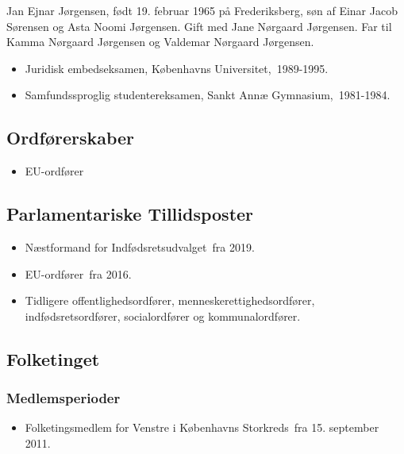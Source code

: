 \documentclass[11pt, a4paper]{awesome-cv}
\begin{document}
\makecvheader[R]
\makelettertitle
\begin{cvletter}
Jan Ejnar Jørgensen, født 19. februar 1965 på Frederiksberg, søn af Einar Jacob Sørensen og Asta Noomi Jørgensen. Gift med Jane Nørgaard Jørgensen. Far til Kamma Nørgaard Jørgensen og Valdemar Nørgaard Jørgensen.

\begin{itemize}
\item Juridisk embedseksamen, Københavns Universitet, 1989-1995.
\item Samfundssproglig studentereksamen, Sankt Annæ Gymnasium, 1981-1984.
\end{itemize}
\subsection*{Ordførerskaber}
\begin{itemize}
\item EU-ordfører
\end{itemize}
\subsection*{Parlamentariske Tillidsposter}
\begin{itemize}
\item Næstformand for Indfødsretsudvalget fra 2019.
\item EU-ordfører fra 2016.
\item Tidligere offentlighedsordfører, menneskerettighedsordfører, indfødsretsordfører, socialordfører og kommunalordfører.
\end{itemize}
\subsection*{Folketinget}
\subsubsection*{Medlemsperioder}
\begin{itemize}
\item Folketingsmedlem for Venstre i Københavns Storkreds fra 15. september 2011.
\end{itemize}

\end{cvletter}
\end{document}
